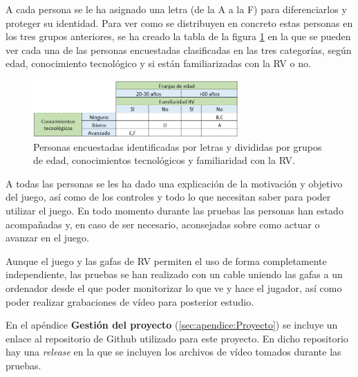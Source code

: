 A cada persona se le ha asignado una letra (de la A a la F) para diferenciarlos y proteger su identidad. Para ver como se distribuyen en concreto estas personas en los tres grupos anteriores, se ha creado la tabla de la figura \ref{fig:tablaPersonasLetras} en la que se pueden ver cada una de las personas encuestadas clasificadas en las tres categorías, según edad, conocimiento tecnológico y si están familiarizadas con la RV o no.




\begin{figure}
	\centering
	\includegraphics[width=0.7\textwidth]{04.Desarrollo/05.Entrega5/02.Iteracion5_2/00.Figuras/02.tabla_personas_letras.png}
	\caption{Personas encuestadas identificadas por letras y divididas por grupos de edad, conocimientos tecnológicos y familiaridad con la RV.}
	\label{fig:tablaPersonasLetras}
\end{figure}


A todas las personas se les ha dado una explicación de la motivación y objetivo del juego, así como de los controles y todo lo que necesitan saber para poder utilizar el juego. En todo momento durante las pruebas las personas han estado acompañadas y, en caso de ser necesario, aconsejadas sobre como actuar o avanzar en el juego.

Aunque el juego y las gafas de RV permiten el uso de forma completamente independiente, las pruebas se han realizado con un cable uniendo las gafas a un ordenador desde el que poder monitorizar lo que ve y hace el jugador, así como poder realizar grabaciones de vídeo para posterior estudio.

En el apéndice \textbf{Gestión del proyecto} (\ref{sec:apendice:Proyecto}) se incluye un enlace al repositorio de Github utilizado para este proyecto. En dicho repositorio hay una \textit{release} en la que se incluyen los archivos de vídeo tomados durante las pruebas.



